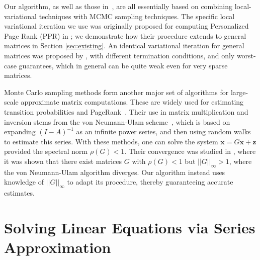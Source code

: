 Our algorithm, as well as those in~\cite{Lofgren2014,lofgren2016personalized,banerjee2015fast}, are all essentially based on combining local-variational techniques with MCMC sampling techniques.
The specific local variational iteration we use was originally proposed for computing Personalized Page Rank (PPR) in \cite{andersen2007local}; we demonstrate how their procedure extends to general matrices in Section \ref{sec:existing}. 
An identical variational iteration for general matrices was proposed by \cite{lee2014asynchronous}, with different termination conditions, and only worst-case guarantees, which in general can be quite weak even for very sparse matrices. 


Monte Carlo sampling methods form another major set of algorithms for large-scale approximate matrix computations. 
These are widely used for estimating transition probabilities and PageRank~\cite{Avrachenkov2007}.
Their use in matrix multiplication and inversion stems from the von Neumann-Ulam scheme~\cite{forsythe1950matrix}, which is based on expanding $(I-A)^{-1}$ as an infinite power series, and then using random walks to estimate this series. 
With these methods, one can solve the system $\mathbf{x} = G\mathbf{x} + \mathbf{z}$ provided the spectral norm $\rho(G) < 1$. 
Their convergence was studied in \cite{ji2013convergence}, where it was shown that there exist matrices $G$ with $\rho(G) < 1$ but  $||G||_\infty > 1$, where the von Neumann-Ulam algorithm diverges.  
Our algorithm instead uses knowledge of $||G||_{\infty}$ to adapt its procedure, thereby guaranteeing accurate estimates.




\section{Solving Linear Equations via Series Approximation}
\label{sec:linsolve}

